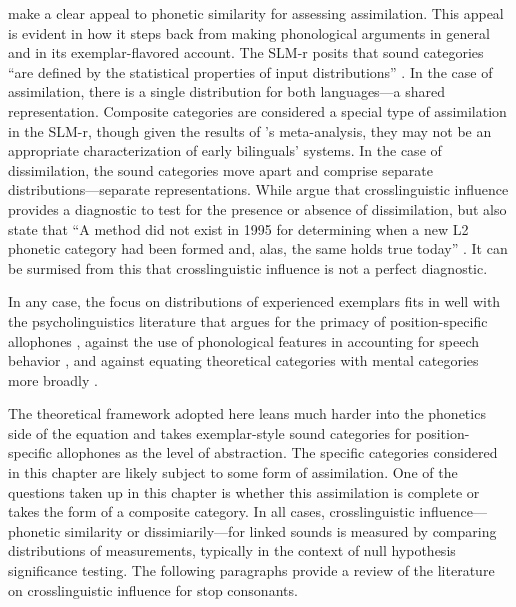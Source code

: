\citeauthor{flege_2021_slmr} make a clear appeal to phonetic similarity for assessing assimilation. This appeal is evident in how it steps back from making phonological arguments in general and in its exemplar-flavored account. The SLM-r posits that sound categories ``are defined by the statistical properties of input distributions'' \citeyearpar[][p. 40]{flege_2021_slmr}. In the case of assimilation, there is a single distribution for both languages---a shared representation. Composite categories are considered a special type of assimilation in the SLM-r, though given the results of \citeauthor{casillas_2021_interlingual}'s \citeyear{casillas_2021_interlingual} meta-analysis, they may not be an appropriate characterization of early bilinguals' systems. In the case of dissimilation, the sound categories move apart and comprise separate distributions---separate representations. While \citeauthor{flege_2021_slmr} argue that crosslinguistic influence provides a diagnostic to test for the presence or absence of dissimilation, but also state that ``A method did not exist in 1995 for determining when a new L2 phonetic category had been formed and, alas, the same holds true today'' \citeyearpar[][p. 41]{flege_2021_slmr}. It can be surmised from this that crosslinguistic influence is not a perfect diagnostic. 


In any case, the focus on distributions of experienced exemplars fits in well with the psycholinguistics literature that argues for the primacy of position-specific allophones \citep{mitterer_2018_allophones}, against the use of phonological features in accounting for speech behavior \citep{llompart_2018_acoustic}, and against equating theoretical categories with mental categories more broadly \citep{samuel_2020_resist}.

The theoretical framework adopted here leans much harder into the phonetics side of the equation and takes exemplar-style sound categories for position-specific allophones as the level of abstraction. The specific categories considered in this chapter are likely subject to some form of assimilation. One of the questions taken up in this chapter is whether this assimilation is complete or takes the form of a composite category. In all cases, crosslinguistic influence---phonetic similarity or dissimiarily---for linked sounds is measured by comparing distributions of measurements, typically in the context of null hypothesis significance testing. The following paragraphs provide a review of the literature on crosslinguistic influence for stop consonants. 


